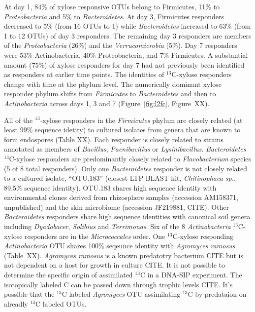 At day 1, 84\% of xylose responsive OTUs belong to Firmicutes, 11\% to
\textit{Proteobacteria} and 5\% to \textit{Bacteroidetes}. At day 3,
Firmicutes responders decreased to 5\% (from 16 OTUs to 1) while
\textit{Bacteroidetes} increased to 63\% (from 1 to 12 OTUs) of day 3
responders. The remaining day 3 responders are members of the
\textit{Proteobacteria} (26\%) and the \textit{Verrucomicrobia} (5\%). Day 7
responders were 53\% Actinobacteria, 40\% Proteobacteria, and 7\% Firmicutes. A
substantial amount (75\%) of xylose responders for day 7 had not previously
been identified as responders at earlier time points. The identities of $^{13}$C-xylose
responders change with time at the phylum level. The numerically dominant xylose
responder phylum shifts from \textit{Firmicutes} to \textit{Bacteroidetes} and
then to \textit{Actinobacteria} across days 1, 3 and 7 (Figure~\ref{fig:l2fc},
Figure~XX). 

All of the $^{13}$-xylose responders in the \textit{Firmicutes} phylum are
closely related (at least 99\% sequence idetity) to cultured isolates from
genera that are known to form endospores (Table XX). Each responder is closely
related to strains annotated as members of \textit{Bacillus},
\textit{Paenibacillus} or \textit{Lysinibacillus}. \textit{Bacteroidetes}
$^{13}$C-xylose responders are predominantly closely related to
\textit{Flavobacterium} species (5 of 8 total responders). Only one
\textit{Bacteroidetes} responder is not closely related to a cultured isolate,
``OTU.183'' (closest LTP BLAST hit, \textit{Chitinophaca sp.}, 89.5\% sequence
identity). OTU.183 shares high sequence identity with environmental clones
derived from rhizosphere samples (accession AM158371, unpublished) and the skin
microbiome (accession JF219881, CITE). Other \textit{Bacteroidetes} responders
share high sequence identities with canonical soil genera including
\textit{Dyadobacer}, \textit{Solibius} and \textit{Terrimonas}. Six of the 8
\textit{Actinobacteria} $^{13}$C-xylose responders are in the
\textit{Micrococcales} order. One $^{13}$C-xylose responding
\textit{Actinobacteria} OTU shares 100\% seqeunce identity with
\textit{Agromyces ramosus} (Table~XX).  \textit{Agromyces ramosus} is a known
predatotry bacterium CITE but is not dependent on a host for growth in culture
CITE. It is not possible to determine the specific origin of assimilated
$^{13}$C in a DNA-SIP experiment. The isotopically labeled C can be passed down
through trophic levels CITE. It's possible that the $^{13}$C labeled
\textit{Agromyces} OTU assimilating $^{13}$C by predataion on alreadly $^{13}$C
labeled OTUs.

